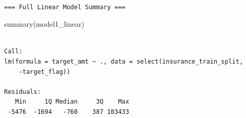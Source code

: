 \documentclass[
  11pt]{article}
\newenvironment{Shaded}{\begin{snugshade}}{\end{snugshade}}
\newcommand{\FunctionTok}[1]{\textcolor[rgb]{0.28,0.35,0.67}{#1}}
\newcommand{\NormalTok}[1]{\textcolor[rgb]{0.00,0.23,0.31}{#1}}
\begin{document}
\begin{verbatim}

=== Full Linear Model Summary ===
\end{verbatim}

\begin{Shaded}
\begin{Highlighting}[]
\FunctionTok{summary}\NormalTok{(model1\_linear)}
\end{Highlighting}
\end{Shaded}

\begin{verbatim}

Call:
lm(formula = target_amt ~ ., data = select(insurance_train_split, 
    -target_flag))

Residuals:
   Min     1Q Median     3Q    Max 
 -5476  -1694   -760    387 103433 


\end{verbatim}
\end{document}
